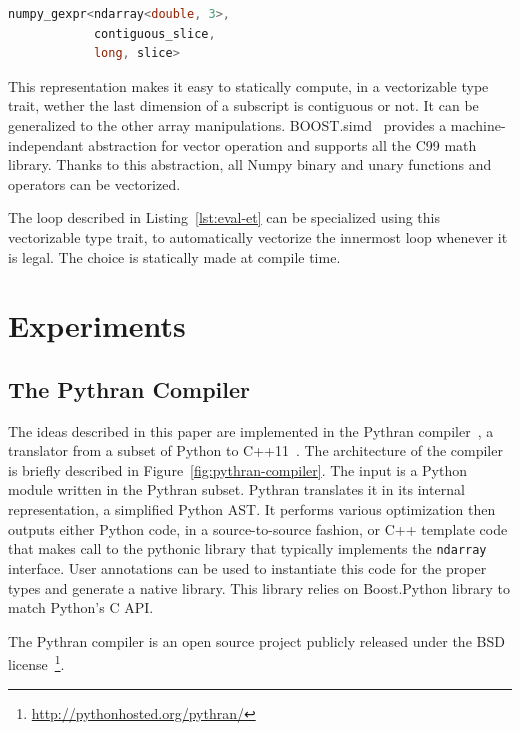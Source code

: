 \documentclass[10pt, preprint]{sigplanconf}
\begin{document}
\begin{lstlisting}[language=c++, caption={C++ type corresponding to the Numpy subscript \lstinline|a[:,0,::2]| on a 3D float matrix}, label={lst:gexpr}]
numpy_gexpr<ndarray<double, 3>,
            contiguous_slice,
            long, slice>
\end{lstlisting}

This representation makes it easy to
statically compute, in a vectorizable type trait, wether the last dimension of
a subscript is contiguous or not. It can be generalized to the other array
manipulations. BOOST.simd~\cite{esterie2012boost} provides a
machine-independant abstraction for vector operation and supports all the C99
math library. Thanks to this abstraction, all Numpy binary and unary functions
and operators can be vectorized.

The loop described in Listing~\ref{lst:eval-et} can be specialized using this
vectorizable type trait, to automatically vectorize the innermost loop whenever
it is legal. The choice is statically made at compile time.


\section{Experiments} \label{sec:xp}

\subsection{The Pythran Compiler}

The ideas described in this paper are implemented in the Pythran
compiler~\cite{pythran2013}, a translator from a subset of Python to
C++11~\cite{isocxx11}. The architecture of the compiler is briefly described
in Figure~\ref{fig:pythran-compiler}. The input is a Python module written in
the Pythran subset. Pythran translates it in its internal representation, a
simplified Python AST. It performs various optimization then outputs either
Python code, in a source-to-source fashion, or C++ template code that makes
call to the pythonic library that typically implements the \texttt{ndarray}
interface. User annotations can be used to instantiate this code for the proper
types and generate a native library. This library relies on Boost.Python
library to match Python's C API.

The Pythran compiler is an open source project publicly released under the BSD
license~\footnote{\url{http://pythonhosted.org/pythran/}}.
\end{document}
